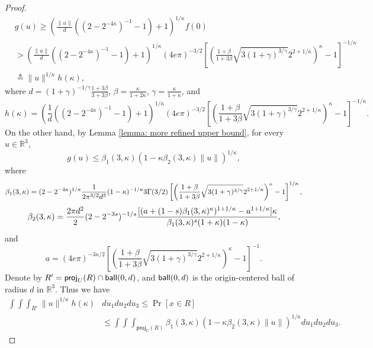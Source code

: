 \documentclass[11pt]{article}
\newcommand{\R}{\mathbb{R}}
\newcommand{\red}[1]{{\color{black}#1}}
\newcommand{\ball}{\textup{\textsf{ball}}}
\begin{document}
{{{{\begin{proof}
\begin{equation*}
\begin{split}
&g(u)\ge \left(\frac{\|u\|}{d}((2-2^{-4\kappa})^{-1}-1)+1\right)^{1/\kappa}f(0)\\
&>\left(\frac{\|u\|}{d}((2-2^{-4\kappa})^{-1}-1)+1\right)^{1/\kappa}(4e\pi)^{-3/2}\left[\left(\frac{1+\beta}{1+3\beta}\sqrt{3(1+\gamma)^{3/\gamma}}2^{2+1/\kappa}\right)^{\kappa}-1\right]^{-1/\kappa}\\
&\triangleq \|u\|^{1/\kappa}h(\kappa),
\end{split}
\end{equation*}
where $d=(1+\gamma)^{-1/\gamma}\frac{1+3\beta}{3+3\beta}$, $\beta=\frac{\kappa}{1+2\kappa}$, $\gamma=\frac{\kappa}{1+\kappa}$, and
\begin{equation*}
h(\kappa)=\left(\frac{1}{d}((2-2^{-4\kappa})^{-1}-1)+1\right)^{1/\kappa}(4e\pi)^{-3/2}\left[\left(\frac{1+\beta}{1+3\beta}\sqrt{3(1+\gamma)^{3/\gamma}}2^{2+1/\kappa}\right)^{\kappa}-1\right]^{-1/\kappa}.
\end{equation*}
On the other hand, by Lemma \ref{lemma: more refined upper bound}, for every $u\in\R^3$,
\begin{equation*}
g(u)\le\beta_1(3,\kappa)(1-\kappa\beta_2(3,\kappa)\|u\|)^{1/\kappa},
\end{equation*}
where
\begin{equation*}
\red{\beta_1(3,\kappa)=(2-2^{-4\kappa})^{1/\kappa}\frac{1}{2\pi^{3/2}d^3}(1-\kappa)^{-1/\kappa}3\Gamma(3/2)\left[\left(\frac{1+\beta}{1+3\beta}\sqrt{3(1+\gamma)^{3/\gamma}}2^{2+1/\kappa}\right)^{\kappa}-1\right]^{1/\kappa},}
\end{equation*}
\begin{equation*}
\red{\beta_2(3,\kappa)=\frac{2\pi d^2}{2}(2-2^{-3s})^{-1/s}\frac{[(a+(1-s)\beta_1(3,\kappa)^\kappa)^{1+1/\kappa}-a^{1+1/\kappa}]\kappa}{\beta_1(3,\kappa)^s(1+\kappa)(1-\kappa)},}
\end{equation*}
and
\begin{equation*}
a=(4e\pi)^{-3\kappa/2}\left[\left(\frac{1+\beta}{1+3\beta}\sqrt{3(1+\gamma)^{3/\gamma}}2^{2+1/\kappa}\right)^{\kappa}-1\right]^{-1}.
\end{equation*}
Denote by $R'=\textsf{proj}_U(R)\cap \ball(0,d)$, and $\ball(0,d)$ is the origin-centered ball of radius $d$ in $\R^3$. Thus we have
\begin{equation*}
\begin{split}
\int\int\int_{R'}\|u\|^{1/\kappa}h(\kappa)&du_1du_2du_3\le \Pr[x\in R]\\
&\le \int\int\int_{\textsf{proj}_U(R)}\beta_1(3,\kappa)(1-\kappa\beta_2(3,\kappa)\|u\|)^{1/\kappa}du_1du_2du_3.

\end{split}
\end{equation*}
\end{proof}}}}}
\end{document}
